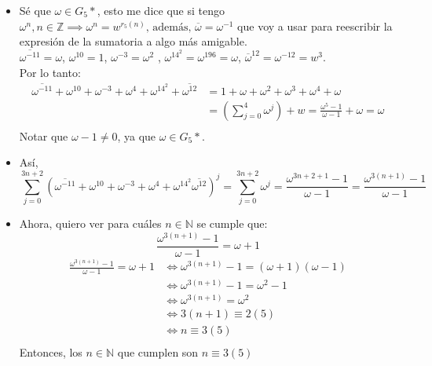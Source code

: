 \documentclass[12pt,twoside,a4paper]{exam}
\begin{document}
\begin{itemize}
\item Sé que $\omega \in G_5*$, esto me dice que si tengo $\omega^n, n \in \mathbb{Z} 
  \implies \omega^n=w^{r_5(n)}\text{, además, } \overline{\omega}=\omega^{-1}$ que voy a usar para
      reescribir la expresión de la sumatoria a algo más amigable.\\
      $\overline{\omega^{-11}}=\omega$, $\omega^{10}=1$, $\omega^{-3}=\omega^{2}$
      , $\omega^{14^2}=\omega^{196}=\omega$, $\overline{\omega}^{12}=\omega^{-12}=w^3.$
      \\Por lo tanto: 
\begin{align*}
      \overline{\omega^{-11}}+\omega^{10}+\omega^{-3}+\omega^{4}+
      \omega^{14^2}+\overline{\omega^{12}}&= 1+\omega+\omega^2+\omega^3+\omega^4
      +\omega  \\&=(\sum_{j=0}^4\omega^j)+w =\frac{\omega^5-1}
      {\omega-1} +\omega = \omega  \\
\end{align*}
    Notar que $\omega-1\neq0$, ya que $\omega \in G_5*$.
\item Así,  $$\sum_{j=0}^{3n+2}(\overline{\omega^{-11}}+\omega^{10}+\omega^{-3}
      +\omega^{4}+\omega^{14^2}\overline{\omega^{12}})^j=\sum_{j=0}^{3n+2}\omega^j=
      \frac{\omega^{3n+2+1}-1}{\omega-1}= \frac{\omega^{3(n+1)}-1}{\omega-1}$$
\item Ahora, quiero ver para cuáles $n \in \mathbb{N}$ se cumple que: $$
      \frac{\omega^{3(n+1)}-1} {\omega-1}=\omega+1$$
      \begin{align*}
       \frac{\omega^{3(n+1)}-1}{\omega-1}=\omega+1 & \iff \omega^{3(n+1)}-1 =
       (\omega+1)(\omega-1) \\ 
       &\iff \omega^{3(n+1)}-1 = \omega ^2-1 \\
       &\iff  \omega^{3(n+1)} = \omega^2 \\ 
       &\iff 3(n+1) \equiv 2 (5) \\
       &\iff n \equiv 3 (5) \\
       \end{align*}
      Entonces, los $ n \in \mathbb{N}$ que cumplen son $n \equiv 3 (5)$

\end{itemize}
\end{document}
